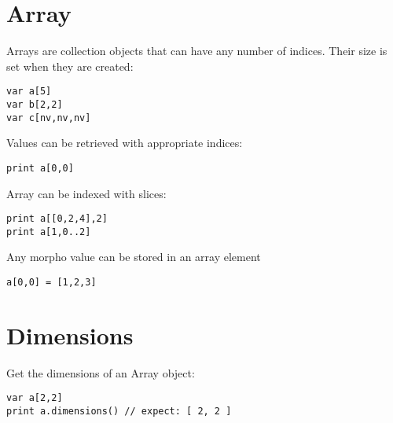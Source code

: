 \hypertarget{array}{%
\section{Array}\label{array}}

Arrays are collection objects that can have any number of indices. Their
size is set when they are created:

\begin{lstlisting}
var a[5]
var b[2,2]
var c[nv,nv,nv]
\end{lstlisting}

Values can be retrieved with appropriate indices:

\begin{lstlisting}
print a[0,0]
\end{lstlisting}

Array can be indexed with slices:

\begin{lstlisting}
print a[[0,2,4],2]
print a[1,0..2]
\end{lstlisting}

Any morpho value can be stored in an array element

\begin{lstlisting}
a[0,0] = [1,2,3]
\end{lstlisting}

\hypertarget{dimensions}{%
\section{Dimensions}\label{dimensions}}

Get the dimensions of an Array object:

\begin{lstlisting}
var a[2,2]
print a.dimensions() // expect: [ 2, 2 ]
\end{lstlisting}
